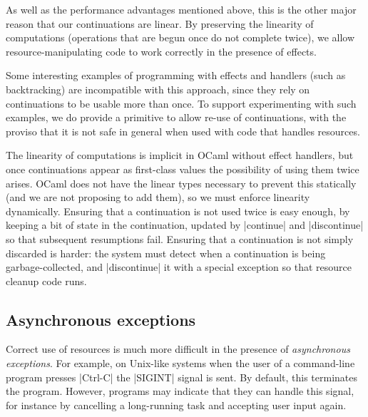 \documentclass{llncs}
\begin{document}
As well as the performance advantages mentioned above, this is
the other major reason that our continuations are linear. By
preserving the linearity of computations (operations that are begun
once do not complete twice), we allow resource-manipulating code to
work correctly in the presence of effects.

Some interesting examples of programming with effects and handlers
(such as backtracking) are incompatible with this approach, since they
rely on continuations to be usable more than once. To support
experimenting with such examples, we do provide a primitive to allow
re-use of continuations, with the proviso that it is not safe in
general when used with code that handles resources.

The linearity of computations is implicit in OCaml without effect
handlers, but once continuations appear as first-class values the
possibility of using them twice arises. OCaml does not have the linear
types necessary to prevent this statically (and we are not proposing
to add them), so we must enforce linearity dynamically. Ensuring that
a continuation is not used twice is easy enough, by keeping a bit of
state in the continuation, updated by |continue| and
|discontinue| so that subsequent resumptions fail. Ensuring that
a continuation is not simply discarded is harder: the system must
detect when a continuation is being garbage-collected, and
|discontinue| it with a special exception so that resource
cleanup code runs.

\subsection{Asynchronous exceptions}

Correct use of resources is much more difficult in the presence of
\emph{asynchronous exceptions}. For example, on Unix-like systems when
the user of a command-line program presses |Ctrl-C| the
|SIGINT| signal is sent. By default, this
terminates the program. However, programs may indicate that they can
handle this signal, for instance by cancelling a long-running
task and accepting user input again.
\end{document}
